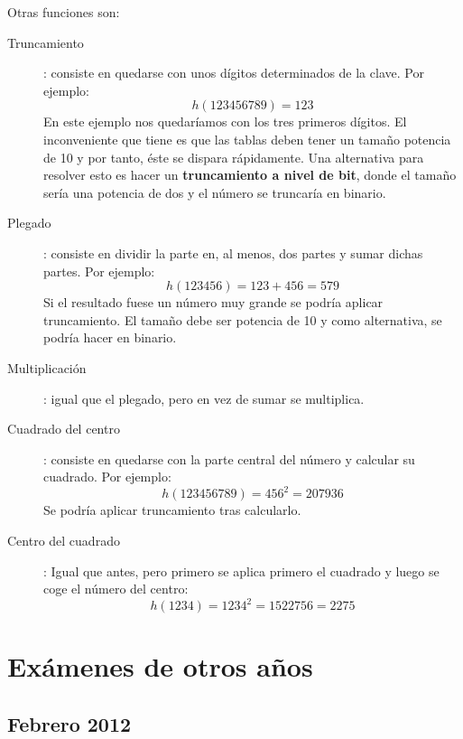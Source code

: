 \documentclass[10pt,a4paper,spanish]{report}
\begin{document}
\noindent
Otras funciones son:
\begin{description}
      \item[Truncamiento]: consiste en quedarse con unos dígitos determinados de la clave. Por ejemplo:
      \begin{displaymath}
      h(123456789) = 123
      \end{displaymath}
      En este ejemplo nos quedaríamos con los tres primeros dígitos. 
      El inconveniente que tiene es que las tablas deben tener un tamaño potencia de 10 y por tanto, éste se dispara rápidamente. Una alternativa para resolver esto es hacer un \textbf{\textcolor[rgb]{0.3,0.4,0.8}{truncamiento a nivel de bit}}, donde el tamaño sería una potencia de dos y el número se truncaría en binario.
      \item[Plegado]: consiste en dividir la parte en, al menos, dos partes y sumar dichas partes. Por ejemplo:
      \begin{displaymath}
      h(123456) = 123 + 456 = 579
      \end{displaymath}
      Si el resultado fuese un número muy grande se podría aplicar truncamiento. El tamaño debe ser potencia de 10 y como alternativa, se podría hacer en binario.
      \item[Multiplicación]: igual que el plegado, pero en vez de sumar se multiplica.
      \item[Cuadrado del centro]: consiste en quedarse con la parte central del número y calcular su cuadrado. Por ejemplo:
      \begin{displaymath}
      h(123456789) = 456^2 = 207936
      \end{displaymath}
      Se podría aplicar truncamiento tras calcularlo.
      \item[Centro del cuadrado]: Igual que antes, pero primero se aplica primero el cuadrado y luego se coge el número del centro:
      \begin{displaymath}
      h(1234) = 1234^2 = 1522756 = 2275
      \end{displaymath}
\end{description}

\chapter{\textcolor[rgb]{0.5,0.8,1}{Exámenes de otros años}}
\section{\textcolor[rgb]{0.5,0.8,1}Febrero 2012}
\end{document}
